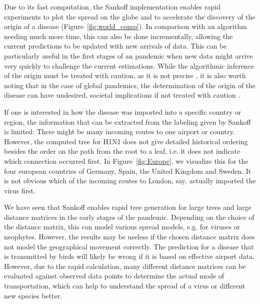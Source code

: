\documentclass{article}
\begin{document}
Due to its fast computation, the Sankoff implementation enables rapid
experiments to plot the spread on the globe and to accelerate the discovery 
of the origin of a disease
(Figure~\ref{fig:world_comp}). In comparison with an algorithm needing much more time,
this can also be done incrementally, allowing the current predictions to be
updated with new arrivals of data. This can be particularly useful in the first stages
of an pandemic when new data might arrive very quickly to challenge the current
estimations. While the algorithmic inference of the origin must be
treated with caution, as it is not precise
\cite{reimeringPhylogeographicReconstructionUsing2020}, it is also worth noting
that in the case of global pandemics, the determination of the origin of the
disease can have undesired, societal implications if not treated with caution
\cite{chenPotentialImpactCOVID192020}.

If one is interested in how the disease was imported into a specific country or
region, the information that can be extracted from the labeling given by Sankoff
is limited: There might be many incoming routes to one airport or country. However,
the computed tree for H1N1 does not give detailed historical ordering besides
the order on the path from the root to a leaf, i.e. it
does not indicate which connection occurred first. In Figure~\ref{fig:Europe},
we visualize this for the four european countries of Germany, Spain, the United
Kingdom and Sweden. It is not obvious which of the incoming routes to London,
say, actually imported the virus first.

We have seen that Sankoff enables rapid tree generation for large trees and
large distance matrices in the early stages of the pandemic. Depending on the
choice of the distance matrix, this can model various spread models, e.g. for
viruses or neophytes. However, the results may be useless if the chosen distance
matrix does not model the geographical movement correctly. The prediction for a
disease that is transmitted by birds will likely be wrong if it is based on
effective airport data. However, due to the rapid calculation, many different
distance matrices can be evaluated against observed data points to determine the
actual mode of transportation, which can help to understand the spread of a
virus or different new species better.
\end{document}
